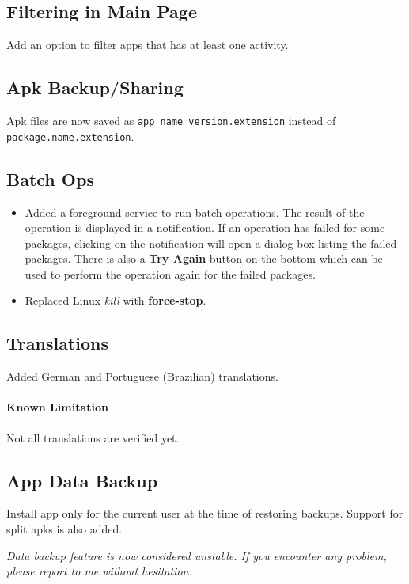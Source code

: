 \subsection{Filtering in Main Page}
Add an option to filter apps that has at least one activity.

\subsection{Apk Backup/Sharing}
Apk files are now saved as \texttt{app name\_version.extension} instead of \texttt{package.name.extension}.

\subsection{Batch Ops}
\begin{itemize}
    \item Added a foreground service to run batch operations. The result of the operation is displayed in a notification.
    If an operation has failed for some packages, clicking on the notification will open a dialog box listing the failed
    packages. There is also a \textbf{Try Again} button on the bottom which can be used to perform the operation again for the failed packages.
    \item Replaced Linux \textit{kill} with \textbf{force-stop}.
\end{itemize}

\subsection{Translations}
Added German and Portuguese (Brazilian) translations.

\paragraph{Known Limitation} Not all translations are verified yet.

\subsection{App Data Backup}
Install app only for the current user at the time of restoring backups. Support for split apks is also added.

\textit{Data backup feature is now considered unstable. If you encounter any problem, please report to me without hesitation.}
